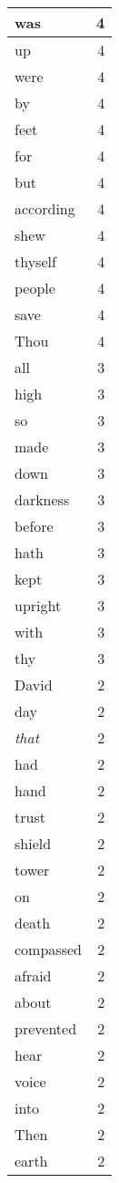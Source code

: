 \begin{center}
\begin{longtable}{l|r}
was & 4 \\ \hline
up & 4 \\ \hline
were & 4 \\ \hline
by & 4 \\ \hline
feet & 4 \\ \hline
for & 4 \\ \hline
but & 4 \\ \hline
according & 4 \\ \hline
shew & 4 \\ \hline
thyself & 4 \\ \hline
people & 4 \\ \hline
save & 4 \\ \hline
Thou & 4 \\ \hline
all & 3 \\ \hline
high & 3 \\ \hline
so & 3 \\ \hline
made & 3 \\ \hline
down & 3 \\ \hline
darkness & 3 \\ \hline
before & 3 \\ \hline
hath & 3 \\ \hline
kept & 3 \\ \hline
upright & 3 \\ \hline
with & 3 \\ \hline
thy & 3 \\ \hline
David & 2 \\ \hline
day & 2 \\ \hline
\emph{that} & 2 \\ \hline
had & 2 \\ \hline
hand & 2 \\ \hline
trust & 2 \\ \hline
shield & 2 \\ \hline
tower & 2 \\ \hline
on & 2 \\ \hline
death & 2 \\ \hline
compassed & 2 \\ \hline
afraid & 2 \\ \hline
about & 2 \\ \hline
prevented & 2 \\ \hline
hear & 2 \\ \hline
voice & 2 \\ \hline
into & 2 \\ \hline
Then & 2 \\ \hline
earth & 2 \\ \hline

\end{longtable}
\end{center}
